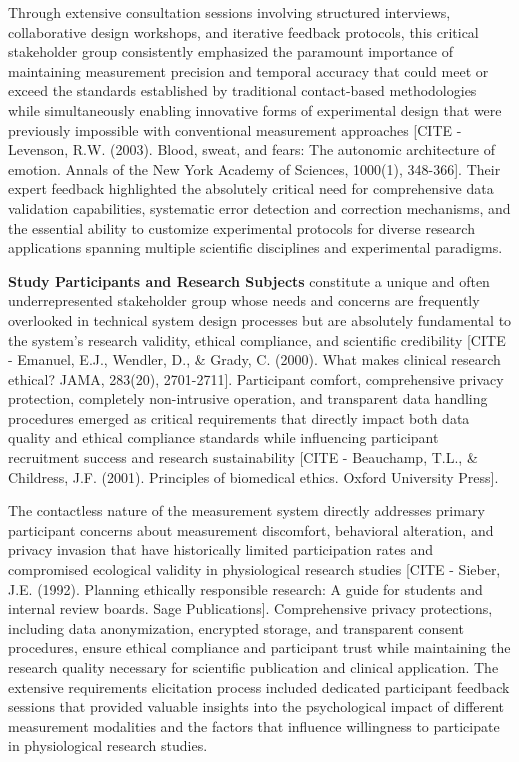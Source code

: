 \documentclass[12pt,a4paper]{report}
\begin{document}
Through extensive consultation sessions involving structured interviews, collaborative design workshops, and iterative
feedback protocols, this critical stakeholder group consistently emphasized the paramount importance of maintaining
measurement precision and temporal accuracy that could meet or exceed the standards established by traditional
contact-based methodologies while simultaneously enabling innovative forms of experimental design that were previously
impossible with conventional measurement
approaches [CITE - Levenson, R.W. (2003). Blood, sweat, and fears: The autonomic architecture of emotion. Annals of the New York Academy of Sciences, 1000(1), 348-366].
Their expert feedback highlighted the absolutely critical need for comprehensive data validation capabilities,
systematic error detection and correction mechanisms, and the essential ability to customize experimental protocols for
diverse research applications spanning multiple scientific disciplines and experimental paradigms.

\textbf{Study Participants and Research Subjects} constitute a unique and often underrepresented stakeholder group whose
needs and concerns are frequently overlooked in technical system design processes but are absolutely fundamental to the
system's research validity, ethical compliance, and scientific
credibility [CITE - Emanuel, E.J., Wendler, D., \& Grady, C. (2000). What makes clinical research ethical? JAMA, 283(20), 2701-2711].
Participant comfort, comprehensive privacy protection, completely non-intrusive operation, and transparent data handling
procedures emerged as critical requirements that directly impact both data quality and ethical compliance standards
while influencing participant recruitment success and research
sustainability [CITE - Beauchamp, T.L., \& Childress, J.F. (2001). Principles of biomedical ethics. Oxford University Press].

The contactless nature of the measurement system directly addresses primary participant concerns about measurement
discomfort, behavioral alteration, and privacy invasion that have historically limited participation rates and
compromised ecological validity in physiological research
studies [CITE - Sieber, J.E. (1992). Planning ethically responsible research: A guide for students and internal review boards. Sage Publications].
Comprehensive privacy protections, including data anonymization, encrypted storage, and transparent consent procedures,
ensure ethical compliance and participant trust while maintaining the research quality necessary for scientific
publication and clinical application. The extensive requirements elicitation process included dedicated participant
feedback sessions that provided valuable insights into the psychological impact of different measurement modalities and
the factors that influence willingness to participate in physiological research studies.
\end{document}
